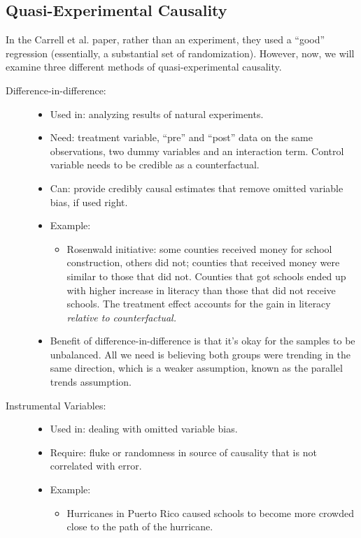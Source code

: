 \documentclass[10pt]{extarticle}
\begin{document}
  \subsection{Quasi-Experimental Causality}%
  In the Carrell et al. paper, rather than an experiment, they used a ``good'' regression (essentially, a substantial set of randomization). However, now, we will examine three different methods of quasi-experimental causality.
  \begin{description}
    \item[Difference-in-difference:]\hfill
      \begin{itemize}
        \item Used in: analyzing results of natural experiments.
        \item Need: treatment variable, ``pre'' and ``post'' data on the same observations, two dummy variables and an interaction term. Control variable needs to be credible as a counterfactual.
        \item Can: provide credibly causal estimates that remove omitted variable bias, if used right.
        \item Example:
          \begin{itemize}
            \item Rosenwald initiative: some counties received money for school construction, others did not; counties that received money were similar to those that did not. Counties that got schools ended up with higher increase in literacy than those that did not receive schools. The treatment effect accounts for the gain in literacy \textit{relative to counterfactual.}
          \end{itemize}
        \item Benefit of difference-in-difference is that it's okay for the samples to be unbalanced. All we need is believing both groups were trending in the same direction, which is a weaker assumption, known as the parallel trends assumption.
      \end{itemize}
    \item[Instrumental Variables:] \hfill
      \begin{itemize}
        \item Used in: dealing with omitted variable bias.
        \item Require: fluke or randomness in source of causality that is not correlated with error.
        \item Example:
        \begin{itemize}
          \item Hurricanes in Puerto Rico caused schools to become more crowded close to the path of the hurricane.

\end{itemize}
\end{itemize}
\end{description}
\end{document}
